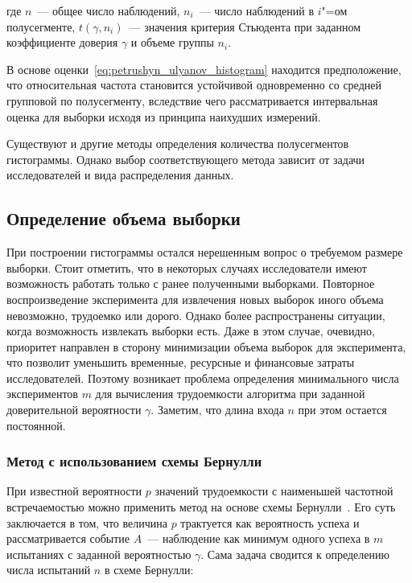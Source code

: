 \documentclass[a4paper, article, 14pt]{extarticle}
\begin{document}
\noindent где $n$~--- общее число наблюдений, $n_i$~--- число наблюдений в $i$"=ом полусегменте, $t(\gamma, n_i)$~--- значения критерия Стьюдента при заданном коэффициенте доверия $\gamma$ и объеме группы $n_i$.

В основе оценки~\eqref{eq:petrushyn_ulyanov_histogram} находится предположение, что относительная частота становится устойчивой одновременно со средней групповой по полусегменту, вследствие чего рассматривается интервальная оценка для выборки исходя из принципа наихудших измерений.

Существуют и другие методы определения количества полусегментов гистограммы. Однако выбор соответствующего метода зависит от задачи исследователей и вида распределения данных.

\subsection{Определение объема выборки}\label{sec:selection_size}

При построении гистограммы остался нерешенным вопрос о требуемом размере выборки. Стоит отметить, что в некоторых случаях исследователи имеют возможность работать только с ранее полученными выборками. Повторное воспроизведение эксперимента для извлечения новых выборок иного объема невозможно, трудоемко или дорого. Однако более распространены ситуации, когда возможность извлекать выборки есть. Даже в этом случае, очевидно, приоритет направлен в сторону минимизации объема выборок для эксперимента, что позволит уменьшить временные, ресурсные и финансовые затраты исследователей. Поэтому возникает проблема определения минимального числа экспериментов $m$ для вычисления трудоемкости алгоритма при заданной доверительной вероятности $\gamma$. Заметим, что длина входа $n$ при этом остается постоянной.

\subsubsection{Метод с использованием схемы Бернулли}\label{sec:bernoulli_selection_size}

При известной вероятности $p$ значений трудоемкости с наименьшей частотной встречаемостью можно применить метод на основе схемы Бернулли~\cite{petrushyn_ulyanov_definitions}. Его суть заключается в том, что величина $p$ трактуется как вероятность успеха и рассматривается событие $A$~--- наблюдение как минимум одного успеха в $m$ испытаниях с заданной вероятностью $\gamma$. Сама задача сводится к определению числа испытаний $n$ в схеме Бернулли:
\end{document}
